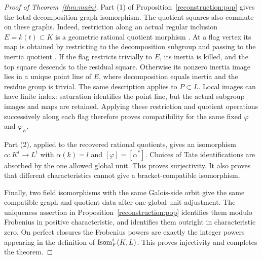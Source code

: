 \begin{proof}[Proof of Theorem~\ref{thm:main}]
Part (1) of Proposition~\ref{reconstruction:pop} gives the total
decomposition-graph isomorphism.  The quotient squares also commute on
these graphs.  Indeed, restriction along an actual regular inclusion
$E=k(t)\subset K$ is a geometric rational quotient morphism
\cite[Section~2, Embeddings and Restrictions]{PopBI2012}.
At a flag vertex its map is obtained by restricting to the decomposition
subgroup and passing to the inertia quotient
\cite[Definition/Remark~24 and Definition~25]{PopGraphs2012}.
If the flag restricts trivially to $E$, its inertia is killed, and the
top square descends to the residual square.  Otherwise its nonzero
inertia image lies in a unique point line of $E$, where decomposition
equals inertia and the residue group is trivial.  The same description
applies to $P\subset L$.  Local images can have finite index: saturation
identifies the point line, but the actual subgroup images and maps are
retained.  Applying these restriction and quotient operations successively
along each flag therefore proves
compatibility for the same fixed $\varphi$ and $\varphi_E$.

Part (2), applied to the recovered rational quotients,
gives an isomorphism $\alpha:K^i\to L^i$ with $\alpha(k)=l$ and
$[\varphi]=[\alpha^*]$.  Choices of Tate identifications are absorbed
by the one allowed global unit.  This proves surjectivity.  It also
proves that different characteristics cannot give a bracket-compatible
isomorphism.

Finally, two field isomorphisms with the same Galois-side orbit give
the same compatible graph and quotient data after one global unit
adjustment.  The uniqueness assertion in
Proposition~\ref{reconstruction:pop} identifies them modulo Frobenius
in positive characteristic, and identifies them outright in
characteristic zero.  On perfect closures the Frobenius powers are
exactly the integer powers appearing in the definition of
$\operatorname{Isom}_F^i(K,L)$.  This proves injectivity and completes the theorem.
\end{proof}
